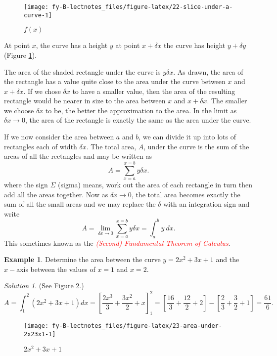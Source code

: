 \documentclass[
  11pt,
  oneside]{book}
\newcommand{\slide}{}
\theoremstyle{definition}
\theoremstyle{definition}
\newtheorem{example}{Example}[chapter]
\theoremstyle{definition}
\theoremstyle{definition}
\theoremstyle{remark}
\newtheorem*{solution}{Solution}
\begin{document}
\begin{figure}

{\centering \texttt{[image: fy-B-lectnotes\_files/figure-latex/22-slice-under-a-curve-1]} 

}

\caption{$f(x)$}\label{fig:22-slice-under-a-curve}
\end{figure}

At point \(x\), the curve has a height \(y\) at point \(x + \delta x\) the curve has height \(y + \delta y\) (Figure \ref{fig:22-slice-under-a-curve}).

The area of the shaded rectangle under the curve is \(y\delta x\). As drawn, the area of the rectangle has a value quite close to the area under the curve between \(x\) and \(x + \delta x\). If we chose \(\delta x\) to have a smaller value, then the area of the resulting rectangle would be nearer in size to the area between \(x\) and \(x + \delta x\). The smaller we choose \(\delta x\) to be, the better the approximation to the area. In the limit as \(\delta x \to 0\), the area of the rectangle is exactly the same as the area under the curve.

\slide

If we now consider the area between \(a\) and \(b\), we can divide it up into lots of rectangles each of width \(\delta x\). The total area, \(A\), under the curve is the sum of the areas of all the rectangles and may be written as
\[
A=\sum_{x=a}^{x=b}y\delta x.
\]
where the sign \(\Sigma\) (sigma) means, work out the area of each rectangle in turn then add all the areas together. Now as \(\delta x \to 0\), the total area becomes exactly the sum of all the small areas and we may replace the \(\delta\) with an integration sign and write
\[
A =\lim\limits_{\delta x\to 0}\sum_{x=a}^{x=b}y\delta x = \int_a^b y\ dx.
\]
This sometimes known as the \textcolor{red}{\em (Second) Fundamental Theorem of Calculus}.
\slide

\begin{example}
Determine the area between the curve \(y=2x^2+3x+1\) and the \(x-\)axis between the values of \(x=1\) and \(x=2\).
\end{example}

\begin{solution}
\leavevmode

(See Figure \ref{fig:23-area-under-2x23x1}.)
\[
A=\int_1^2(2x^2+3x+1)dx = \left[\frac{2x^3}{3}+\frac{3x^2}{2}+x\right]_1^2 = \left[\frac{16}{3}+\frac{12}{2}+2\right]-\left[\frac{2}{3}+\frac 32 + 1\right] = \frac{61}{6}.
\]

\begin{figure}

{\centering \texttt{[image: fy-B-lectnotes\_files/figure-latex/23-area-under-2x23x1-1]} 

}

\caption{$2x^2+3x+1$}\label{fig:23-area-under-2x23x1}
\end{figure}

\end{solution}
\end{document}
